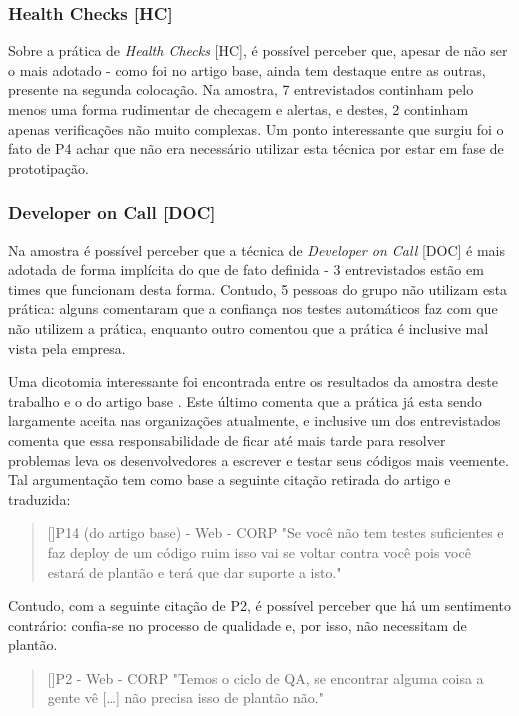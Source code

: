\subsubsection{Health Checks [HC]}

Sobre a prática de \emph{Health Checks} [HC], é possível perceber que, apesar de não ser o mais adotado - como foi no artigo base, ainda tem destaque entre as outras, presente na segunda colocação. Na amostra, 7 entrevistados continham pelo menos uma forma rudimentar de checagem e alertas, e destes, 2 continham apenas verificações não muito complexas. Um ponto interessante que surgiu foi o fato de P4 achar que não era necessário utilizar esta técnica por estar em fase de prototipação.

\subsubsection{Developer on Call [DOC]}

Na amostra é possível perceber que a técnica de \emph{Developer on Call} [DOC] é mais adotada de forma implícita do que de fato definida - 3 entrevistados estão em times que funcionam desta forma. Contudo, 5 pessoas do grupo não utilizam esta prática: alguns comentaram que a confiança nos testes automáticos faz com que não utilizem a prática, enquanto outro comentou que a prática é inclusive mal vista pela empresa.

Uma dicotomia interessante foi encontrada entre os resultados da amostra deste trabalho e o do artigo base \cite{empiricalStudy2016}. Este último comenta que a prática já esta sendo largamente aceita nas organizações atualmente, e inclusive um dos entrevistados comenta que essa responsabilidade de ficar até mais tarde para resolver problemas leva os desenvolvedores a escrever e testar seus códigos mais veemente. Tal argumentação tem como base a seguinte citação retirada do artigo e traduzida:

\begin{quotation}[]{P14 (do artigo base) - Web - CORP}
    "Se você não tem testes suficientes e faz deploy de um código ruim isso vai se voltar contra você pois você estará de plantão e terá que dar suporte a isto."
\end{quotation}

Contudo, com a seguinte citação de P2, é possível perceber que há um sentimento contrário: confia-se no processo de qualidade e, por isso, não necessitam de plantão.

\begin{quotation}[]{P2 - Web - CORP}
    "Temos o ciclo de QA, se encontrar alguma coisa a gente vê […] não precisa isso de plantão não." 
\end{quotation}

